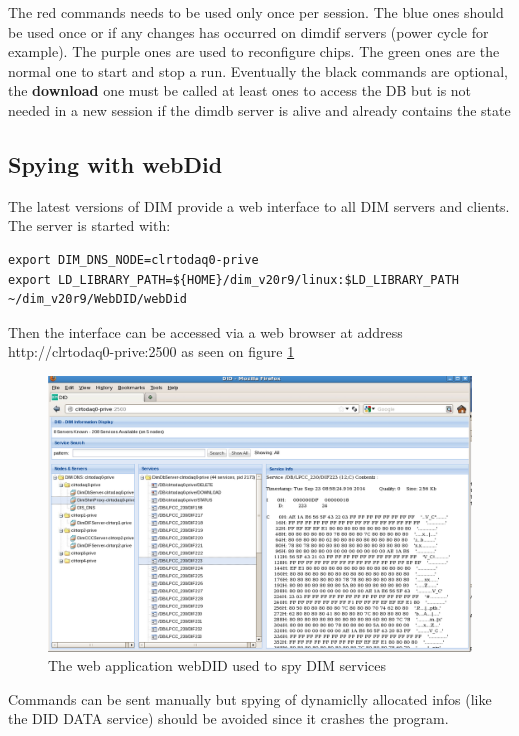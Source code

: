 \documentclass[english]{article}
\begin{document}
The red commands needs to be used only once per session. The blue ones should be used once or if any changes has occurred on dimdif servers (power cycle for example). The purple ones are used to reconfigure chips. The green ones are the normal one to start and stop a run. Eventually the black commands are optional, the {\bf download} one must be called at least ones to access the DB but is not needed in a new session if the dimdb server is alive and already contains the state 
\subsection{Spying with webDid}
The latest versions of DIM provide a web interface to all DIM servers and clients. The server is started with:
\begin{verbatim}
export DIM_DNS_NODE=clrtodaq0-prive
export LD_LIBRARY_PATH=${HOME}/dim_v20r9/linux:$LD_LIBRARY_PATH
~/dim_v20r9/WebDID/webDid
\end{verbatim}

Then the interface can be accessed via a web browser at address http://clrtodaq0-prive:2500 as seen on figure \ref{webdid}
\begin{figure}[htp]
\centering
\includegraphics[width=1.3\textwidth]{./webDid.png}
\caption{The web application webDID used to spy DIM services}
\label{webdid}
\end{figure}

Commands can be sent manually but spying of dynamiclly allocated infos (like the DID DATA service) should be avoided since it crashes the program. 
\end{document}
